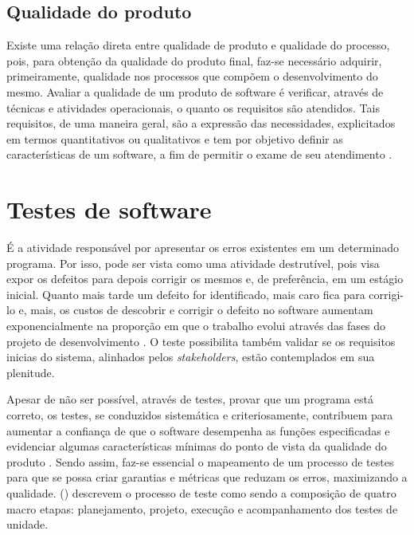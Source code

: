 \documentclass[tg]{mdtufsm}
\begin{document}
\subsection{Qualidade do produto}
Existe uma relação direta entre qualidade de produto e qualidade do processo, pois, para obtenção da qualidade do produto final,
faz-se necessário adquirir, primeiramente, qualidade nos processos que compõem o desenvolvimento do mesmo.
Avaliar a qualidade de um produto de software é verificar, através de técnicas e atividades operacionais, o quanto os requisitos são atendidos. Tais requisitos,
de uma maneira geral, são a expressão das necessidades, explicitados em termos quantitativos ou qualitativos e tem por objetivo definir as características de
um software, a fim de permitir o exame de seu atendimento \cite{koscianski2007qualidade}.

\section{Testes de software}
É a atividade responsável por apresentar os erros existentes em um determinado programa. Por isso, pode ser vista como uma atividade destrutível, pois visa expor os defeitos para depois corrigir os mesmos e, de preferência, em
um estágio inicial. Quanto mais tarde um defeito for identificado, mais caro fica para corrigi-lo e, mais, os custos de descobrir e corrigir o defeito no software aumentam exponencialmente na proporção em que o trabalho
evolui através das fases do projeto de desenvolvimento \cite{boehm1976quantitative}. O teste possibilita também validar se os requisitos inicias do sistema, alinhados pelos \emph{stakeholders}, estão contemplados em sua plenitude.

Apesar de não ser possível, através de testes, provar que um programa está correto, os testes, se conduzidos sistemática e criteriosamente, contribuem para
aumentar a confiança de que o software desempenha as funções especificadas e evidenciar algumas características mínimas do ponto de vista da qualidade do produto \cite{maldonado2004introduccao}. Sendo assim,
faz-se essencial o mapeamento de um processo de testes para que se possa criar garantias e métricas que reduzam os erros, maximizando a qualidade. \citeauthor{crespo2004metodologia} (\citeyear{crespo2004metodologia}) descrevem o processo de
teste como sendo a composição de quatro macro etapas: planejamento, projeto, execução e acompanhamento dos testes de unidade.
\end{document}
